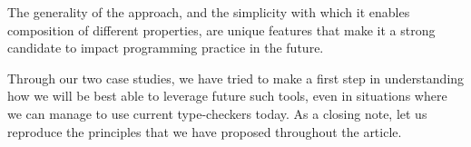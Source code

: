 \documentclass[sigconf, review]{acmart}
\begin{document}
The generality of the approach, and the simplicity with which it enables
composition of different properties, are unique features that make it a strong
candidate to impact programming practice in the future.

Through our two case studies, we have tried to make a first step in
understanding how we will be best able to leverage future such tools, even
in situations where we can manage to use current type-checkers today. As a closing
note, let us reproduce the principles that we have proposed throughout the article.

\vspace{-0.8cm}
\listofkeytheorems[
  ignoreall,
  show={principle},
  print-body,
  title={},
  ]



\end{document}

